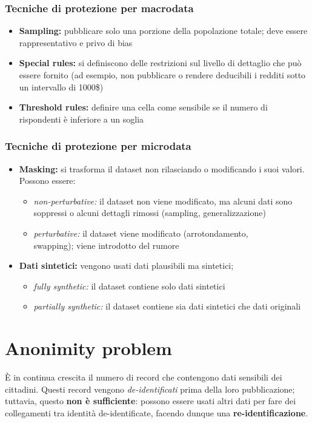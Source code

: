 \documentclass{report}
\begin{document}
\subsubsection{Tecniche di protezione per macrodata}
\begin{itemize}
    \item \textbf{Sampling:} pubblicare solo una porzione della popolazione totale; deve essere rappresentativo e privo di bias
    \item \textbf{Special rules:} si definiscono delle restrizioni sul livello di dettaglio che può essere fornito (ad esempio, non pubblicare o rendere
    deducibili i redditi sotto un intervallo di 1000\$)
    \item \textbf{Threshold rules:} definire una cella come sensibile se il numero di rispondenti è inferiore a un soglia
\end{itemize}

\subsubsection{Tecniche di protezione per microdata}
\begin{itemize}
    \item \textbf{Masking:} si trasforma il dataset non rilasciando o modificando i suoi valori. Possono essere:
    \begin{itemize}
        \item \textit{non-perturbative:} il dataset non viene modificato, ma alcuni dati sono soppressi o alcuni dettagli rimossi (sampling, generalizzazione)
        \item \textit{perturbative:} il dataset viene modificato (arrotondamento, \\swapping); viene introdotto del rumore
    \end{itemize}
    \item \textbf{Dati sintetici:} vengono usati dati plausibili ma sintetici;
    \begin{itemize}
        \item \textit{fully synthetic:} il dataset contiene solo dati sintetici
        \item \textit{partially synthetic:} il dataset contiene sia dati sintetici che dati originali
    \end{itemize}
\end{itemize}

\section{Anonimity problem}
È in continua crescita il numero di record che contengono dati sensibili dei cittadini. Questi record
vengono \textit{de-identificati} prima della loro pubblicazione; tuttavia, questo \textbf{non è sufficiente}: possono essere 
usati altri dati per fare dei collegamenti tra identità de-identificate, facendo dunque
una \textbf{re-identificazione}.
\end{document}
